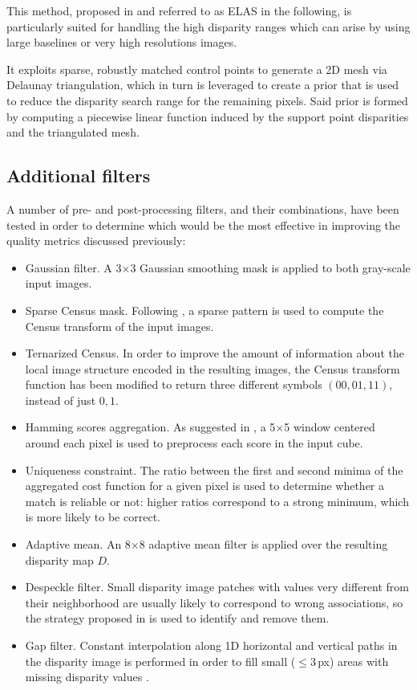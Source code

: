 This method, proposed in \cite{Geiger2011} and referred to as ELAS in the following, is particularly suited for handling the high disparity ranges which can arise by using large baselines or very high resolutions images.

It exploits sparse, robustly matched control points to generate a 2D mesh via Delaunay triangulation, which in turn is leveraged to create a prior that is used to reduce the disparity search range for the remaining pixels. Said prior is formed by computing a piecewise linear function induced by the support point disparities and the triangulated mesh.

\subsection{Additional filters}\label{ch:chapter03_03_03}

A number of pre- and post-processing filters, and their combinations, have been tested in order to determine which would be the most effective in improving the quality metrics discussed previously:

\begin{itemize}
\item Gaussian filter. A 3$\times$3 Gaussian smoothing mask is applied to both gray-scale input images.
\item Sparse Census mask. Following \cite{Pantilie2012}, a sparse pattern is used to compute the Census transform of the input images.
\item Ternarized Census. In order to improve the amount of information about the local image structure encoded in the resulting images, the Census transform function has been modified to return three different symbols $(00, 01, 11)$, instead of just $0, 1$.
\item Hamming scores aggregation. As suggested in \cite{Pantilie2012}, a 5$\times$5 window centered around each pixel is used to preprocess each score in the input cube.
\item Uniqueness constraint. The ratio between the first and second minima of the aggregated cost function for a given pixel is used to determine whether a match is reliable or not: higher ratios correspond to a strong minimum, which is more likely to be correct.
\item Adaptive mean. An 8$\times$8 adaptive mean filter \citep{Geiger2011} is applied over the resulting disparity map $D$.
\item Despeckle filter. Small disparity image patches with values very different from their neighborhood are usually likely to correspond to wrong associations, so the strategy proposed in \cite{Hirschmuller2008} is used to identify and remove them.
\item Gap filter. Constant interpolation along 1D horizontal and vertical paths in the disparity image is performed in order to fill small ($\leq 3$\,px) areas with missing disparity values \citep{Geiger2011}.
\end{itemize}

